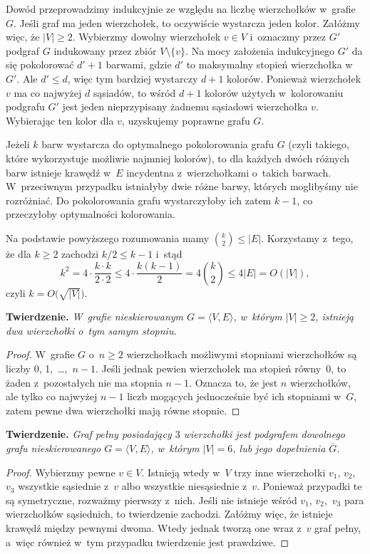 \subproblem %
Dowód przeprowadzimy indukcyjnie ze względu na liczbę wierzchołków w~grafie $G$. Jeśli graf ma jeden wierzchołek, to oczywiście wystarcza jeden kolor. Załóżmy więc, że $|V|\ge2$. Wybierzmy dowolny wierzchołek $v\in V$ i~oznaczmy przez $G'$ podgraf $G$ indukowany przez zbiór $V\setminus\{v\}$. Na mocy założenia indukcyjnego $G'$ da się pokolorować $d'+1$ barwami, gdzie $d'$ to maksymalny stopień wierzchołka w~$G'$. Ale $d'\le d$, więc tym bardziej wystarczy $d+1$ kolorów. Ponieważ wierzchołek $v$ ma co najwyżej $d$ sąsiadów, to wśród $d+1$ kolorów użytych w~kolorowaniu podgrafu $G'$ jest jeden nieprzypisany żadnemu sąsiadowi wierzchołka $v$. Wybierając ten kolor dla $v$, uzyskujemy poprawne  grafu $G$.

\subproblem %
Jeżeli $k$ barw wystarcza do optymalnego pokolorowania grafu $G$ (czyli takiego, które wykorzystuje możliwie najmniej kolorów), to dla każdych dwóch różnych barw istnieje krawędź w~$E$ incydentna z~wierzchołkami o~takich barwach. W~przeciwnym przypadku istniałyby dwie różne barwy, których moglibyśmy nie rozróżniać. Do pokolorowania grafu wystarczyłoby ich zatem $k-1$, co przeczyłoby optymalności kolorowania.

Na podstawie powyższego rozumowania mamy $\binom{k}{2}\le|E|$. Korzystamy z~tego, że dla $k\ge2$ zachodzi $k/2\le k-1$ i~stąd
\[
    k^2 = 4\cdot\frac{k\cdot k}{2\cdot2} \le 4\cdot\frac{k(k-1)}{2} = 4\binom{k}{2} \le 4|E| = O(|V|),
\]
czyli $k=O\bigl(\!\sqrt{|V|}\bigr)$.


\subproblem %
\textsf{\textbf{Twierdzenie.}} \textit{W~grafie nieskierowanym\/ $G=\langle V,E\rangle$, w~którym\/ $|V|\ge2$, istnieją dwa wierzchołki o~tym samym stopniu.}
\begin{proof}
W~grafie $G$ o~$n\ge2$ wierzchołkach możliwymi stopniami wierzchołków są liczby 0, 1,~\dots,~$n-1$. Jeśli jednak pewien wierzchołek ma stopień równy~0, to żaden z~pozostałych nie ma stopnia $n-1$. Oznacza to, że jest $n$ wierzchołków, ale tylko co najwyżej $n-1$ liczb mogących jednocześnie być ich stopniami w~$G$, zatem pewne dwa wierzchołki mają równe stopnie.
\end{proof}

\subproblem %
\textsf{\textbf{Twierdzenie.}} \textit{Graf pełny posiadający\/ $3$ wierzchołki jest podgrafem dowolnego grafu nieskierowanego\/ $G=\langle V,E\rangle$, w~którym\/ $|V|=6$, lub jego dopełnienia\/ $\overline{G}$.}
\begin{proof}
Wybierzmy pewne $v\in V$. Istnieją wtedy w~$V$ trzy inne wierzchołki $v_1$, $v_2$,~$v_3$ wszystkie sąsiednie z~$v$ albo wszystkie niesąsiednie z~$v$. Ponieważ przypadki te są symetryczne, rozważmy pierwszy z~nich. Jeśli nie istnieje wśród $v_1$, $v_2$,~$v_3$ para wierzchołków sąsiednich, to twierdzenie zachodzi. Załóżmy więc, że istnieje krawędź między pewnymi dwoma. Wtedy jednak tworzą one wraz z~$v$ graf pełny, a~więc również w~tym przypadku twierdzenie jest prawdziwe.
\end{proof}

